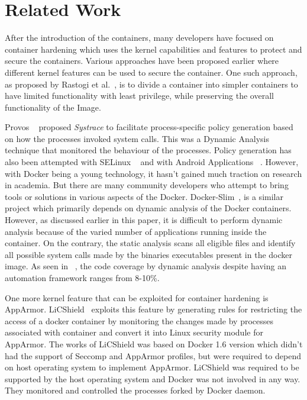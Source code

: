 \section{Related Work}
\label{sec:relwork}

After the introduction of the containers, many developers have focused on container hardening which uses the kernel capabilities and features to protect and secure the containers. Various approaches have been proposed earlier where different kernel features can be used to secure the container. One such approach, as proposed by Rastogi et al.~\cite{rastogi}, is to divide a container into simpler containers to have limited functionality with least privilege, while preserving the overall functionality of the Image.  

Provos ~\cite{provos2003improving} proposed \textit{Systrace} to facilitate process-specific policy generation based on how the processes invoked system calls. This was a Dynamic Analysis technique that monitored the behaviour of the processes. Policy generation has also been attempted with SELinux ~\cite{sniffen2006guided, harada2003access} and with Android Applications ~\cite{afonso2016going}. However, with Docker being a young technology, it hasn't gained much traction on research in academia. But there are many community developers who attempt to bring tools or solutions in various aspects of the Docker. Docker-Slim~\cite{dockerslim}, is a similar project which primarily depends on dynamic analysis of the Docker containers. However, as discussed earlier in this paper, it is difficult to perform dynamic analysis because of the varied number of applications running inside the container. On the contrary, the static analysis scans all eligible files and  identify all possible system calls made by the binaries executables present in the docker image. As seen in ~\cite{afonso2016going}, the code coverage by dynamic analysis despite having an automation framework ranges from 8-10\%.  

One more kernel feature that can be exploited for container hardening is AppArmor. LiCShield~\cite{mattetti} exploits this feature by generating rules for restricting the access of a docker container by monitoring the changes made by processes associated with container and convert it into Linux security module for AppArmor. The works of LiCShield was based on Docker 1.6 version which didn’t had the support of Seccomp and AppArmor profiles, but were required to depend on host operating system to implement AppArmor. LiCShield was required to be supported by the host operating system and Docker was not involved in any way. They monitored and controlled the processes forked by Docker daemon.


